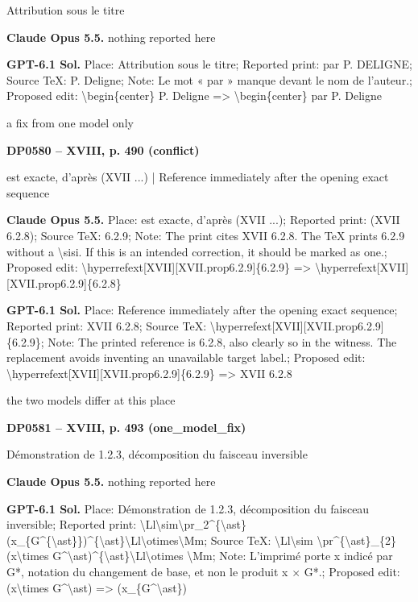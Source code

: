 Attribution sous le titre\par
\textbf{Claude Opus 5.5.} nothing reported here\par
\textbf{GPT-6.1 Sol.} Place: Attribution sous le titre; Reported print: par P. DELIGNE; Source TeX: P. Deligne; Note: Le mot « par » manque devant le nom de l'auteur.; Proposed edit: \textbackslash{}begin\{center\} P. Deligne =\allowbreak > \textbackslash{}begin\{center\} par P. Deligne\par
a fix from one model only\par
\par\noindent\hypertarget{DP0580}{}\textbf{DP0580 -- XVIII, p. 490 (conflict)}\par
est exacte, d'après (XVII ...) | Reference immediately after the opening exact sequence\par
\textbf{Claude Opus 5.5.} Place: est exacte, d'après (XVII ...); Reported print: (XVII 6.2.8); Source TeX: 6.2.9; Note: The print cites XVII 6.2.8. The TeX prints 6.2.9 without a \textbackslash{}sisi. If this is an intended correction, it should be marked as one.; Proposed edit: \textbackslash{}hyperrefext[XVII][XVII.prop6.2.9]\{6.2.9\} =\allowbreak > \textbackslash{}hyperrefext[XVII][XVII.prop6.2.9]\{6.2.8\}\par
\textbf{GPT-6.1 Sol.} Place: Reference immediately after the opening exact sequence; Reported print: XVII 6.2.8; Source TeX: \textbackslash{}hyperrefext[XVII][XVII.prop6.2.9]\{6.2.9\}; Note: The printed reference is 6.2.8, also clearly so in the witness. The replacement avoids inventing an unavailable target label.; Proposed edit: \textbackslash{}hyperrefext[XVII][XVII.prop6.2.9]\{6.2.9\} =\allowbreak > XVII 6.2.8\par
the two models differ at this place\par
\par\noindent\hypertarget{DP0581}{}\textbf{DP0581 -- XVIII, p. 493 (one\_model\_fix)}\par
Démonstration de 1.2.3, décomposition du faisceau inversible\par
\textbf{Claude Opus 5.5.} nothing reported here\par
\textbf{GPT-6.1 Sol.} Place: Démonstration de 1.2.3, décomposition du faisceau inversible; Reported print: \textbackslash{}Ll\textbackslash{}sim\textbackslash{}pr\_2\textasciicircum{}\{\textbackslash{}ast\}(x\_\{G\textasciicircum{}\{\textbackslash{}ast\}\})\textasciicircum{}\{\textbackslash{}ast\}\textbackslash{}Ll\textbackslash{}otimes\textbackslash{}Mm; Source TeX: \textbackslash{}Ll\textbackslash{}sim  \textbackslash{}pr\textasciicircum{}\{\textbackslash{}ast\}\_\{2\}(x\textbackslash{}times G\textasciicircum{}\textbackslash{}ast)\textasciicircum{}\{\textbackslash{}ast\}\textbackslash{}Ll\textbackslash{}otimes \textbackslash{}Mm; Note: L'imprimé porte x indicé par G*, notation du changement de base, et non le produit x \ensuremath{\times} G*.; Proposed edit: (x\textbackslash{}times G\textasciicircum{}\textbackslash{}ast) =\allowbreak > (x\_\{G\textasciicircum{}\textbackslash{}ast\})\par
